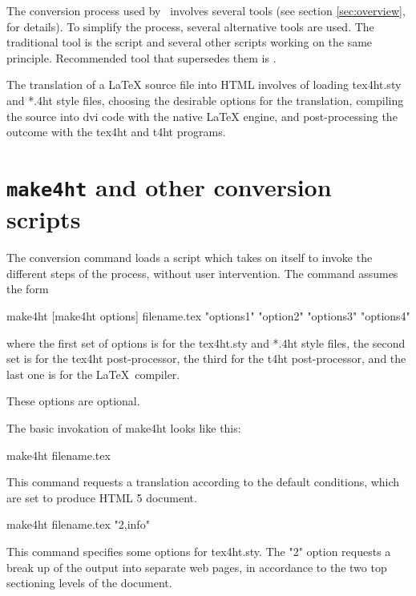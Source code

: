The conversion process used by \texfourht\ involves several tools
(see section \ref{sec:overview},  for details). To
simplify the process, several alternative tools are used. The traditional tool
is the  script and several other scripts working on the same
principle. Recommended tool that supersedes them is .


The translation of a LaTeX source file into HTML involves of loading tex4ht.sty
and *.4ht style files, choosing the desirable options for the translation,
compiling the source into dvi code with the native LaTeX engine, and
post-processing the outcome with the tex4ht and t4ht programs.

\section{\texttt{make4ht} and other conversion scripts}
\label{sec:make4ht-intro}

The conversion command loads a script which takes on itself to invoke the
different steps of the process, without user intervention. The command assumes
the form

\begin{shellcommand}
make4ht [make4ht options] filename.tex "options1" "option2" "options3" "options4"
\end{shellcommand}

where the first set of options is for the tex4ht.sty and *.4ht style files, the
second set is for the tex4ht post-processor, the third for the t4ht
post-processor, and the last one is for the \LaTeX\ compiler. 

These options are optional.

The basic invokation of make4ht looks like this:

\begin{shellcommand}
make4ht filename.tex
\end{shellcommand}

This command requests a translation according to the default conditions, which are set to produce HTML 5 document.

\begin{shellcommand}
make4ht filename.tex "2,info"
\end{shellcommand}

This command specifies some options for tex4ht.sty. The "2" option requests a
break up of the output into separate web pages, in accordance to the two top
sectioning levels of the document.

